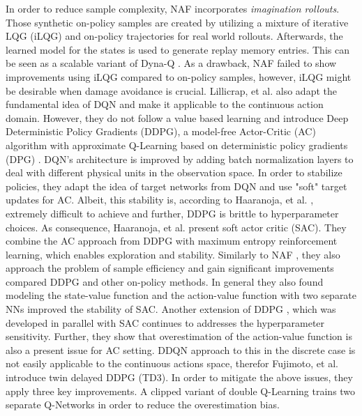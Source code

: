 		In order to reduce sample complexity, NAF incorporates \textit{imagination rollouts}. 
		Those synthetic on-policy samples are created by utilizing a mixture of iterative LQG (iLQG) \cite{Todorov2005} and on-policy trajectories for real world rollouts.
		Afterwards, the learned model for the states is used to generate replay memory entries. 
		This can be seen as a scalable variant of Dyna-Q \cite{Sutton1990}. 
		As a drawback, NAF failed to show improvements using iLQG compared to on-policy samples, however, iLQG might be desirable when damage avoidance is crucial. 
		Lillicrap, et al. \cite{Lillicrap2016} also adapt the fundamental idea of DQN \cite{Mnih2015} and make it applicable to the continuous action domain. 
		However, they do not follow a value based learning and introduce Deep Deterministic Policy Gradients (DDPG), a model-free Actor-Critic (AC) algorithm with approximate Q-Learning based on deterministic policy gradients (DPG) \cite{Silver2014}.
		DQN's \cite{Mnih2015} architecture is improved by adding batch normalization layers \cite{Ioffe2015} to deal with different physical units in the observation space. 
		In order to stabilize policies, they adapt the idea of target networks from DQN \cite{Mnih2015} and use "soft" target updates for AC. 
		Albeit, this stability is, according to Haaranoja, et al. \cite{Haarnoja2018}, extremely difficult to achieve and further, DDPG is brittle to hyperparameter choices. 
		As consequence, Haaranoja, et al. \cite{Haarnoja2018} present soft actor critic (SAC).
		They combine the AC approach from DDPG \cite{Lillicrap2016} with maximum entropy reinforcement learning, which enables exploration and stability. 
		Similarly to NAF \cite{Gu2016}, they also approach the problem of sample efficiency and gain significant improvements compared DDPG and other on-policy methods.
		In general they also found modeling the state-value function and the action-value function with two separate NNs improved the stability of SAC. 
		Another extension of DDPG \cite{Lillicrap2016}, which was developed in parallel with SAC continues to addresses the hyperparameter sensitivity. Further, they show that overestimation of the action-value function is also a present issue for AC setting. 
		DDQN \cite{VanHasselt2016} approach to this in the discrete case is not easily applicable to the continuous actions space, therefor Fujimoto, et al. \cite{Fujimoto2018} introduce twin delayed DDPG (TD3). 
		In order to mitigate the above issues, they apply three key improvements.
		A clipped variant of double Q-Learning \cite{VanHasselt2010} trains two separate Q-Networks in order to reduce the overestimation bias.
